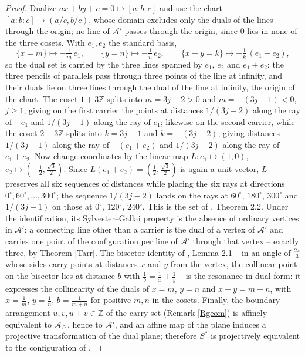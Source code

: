 \documentclass{article}
\def\Z{{\mathbb Z}}
\begin{document}
	\begin{proof}
		Dualize $ax+by+c=0\mapsto[a:b:c]$ and use the chart $[a:b:c]\mapsto(a/c,b/c)$, whose domain excludes only the duals of the lines through the origin; no line of $\mathcal A'$ passes through the origin, since $0$ lies in none of the three cosets. With $e_1,e_2$ the standard basis,
		$$\{x=m\}\mapsto-\tfrac1m\,e_1,\qquad \{y=n\}\mapsto-\tfrac1n\,e_2,\qquad \{x+y=k\}\mapsto-\tfrac1k\,(e_1+e_2),$$
		so the dual set is carried by the three lines spanned by $e_1$, $e_2$ and $e_1+e_2$: the three pencils of parallels pass through three points of the line at infinity, and their duals lie on three lines through the dual of the line at infinity, the origin of the chart. The coset $1+3\Z$ splits into $m=3j-2>0$ and $m=-(3j-1)<0$, $j\geq1$, giving on the first carrier the points at distances $1/(3j-2)$ along the ray of $-e_1$ and $1/(3j-1)$ along the ray of $e_1$; likewise on the second carrier, while the coset $2+3\Z$ splits into $k=3j-1$ and $k=-(3j-2)$, giving distances $1/(3j-1)$ along the ray of $-(e_1+e_2)$ and $1/(3j-2)$ along the ray of $e_1+e_2$. Now change coordinates by the linear map $L\colon e_1\mapsto(1,0)$, $e_2\mapsto(-\frac12,\frac{\sqrt3}2)$. Since $L(e_1+e_2)=(\frac12,\frac{\sqrt3}2)$ is again a unit vector, $L$ preserves all six sequences of distances while placing the six rays at directions $0^\circ,60^\circ,\dots,300^\circ$; the sequence $1/(3j-2)$ lands on the rays at $60^\circ$, $180^\circ$, $300^\circ$ and $1/(3j-1)$ on those at $0^\circ$, $120^\circ$, $240^\circ$. This is the set of \cite{BDSYZ}, Theorem 2.2. Under the identification, its Sylvester--Gallai property is the absence of ordinary vertices in $\mathcal A'$: a connecting line other than a carrier is the dual of a vertex of $\mathcal A'$ and carries one point of the configuration per line of $\mathcal A'$ through that vertex -- exactly three, by Theorem \ref{Tarr}. The bisector identity of \cite{BDSYZ}, Lemma 2.1 -- in an angle of $\frac{2\pi}3$ whose sides carry points at distances $x$ and $y$ from the vertex, the collinear point on the bisector lies at distance $b$ with $\frac1b=\frac1x+\frac1y$ -- is the resonance in dual form: it expresses the collinearity of the duals of $x=m$, $y=n$ and $x+y=m+n$, with $x=\frac1m$, $y=\frac1n$, $b=\frac1{m+n}$ for positive $m,n$ in the cosets. Finally, the boundary arrangement $u,v,u+v\in\Z$ of the carry set (Remark \ref{Rgeom}) is affinely equivalent to $\mathcal A_\triangle$, hence to $\mathcal A'$, and an affine map of the plane induces a projective transformation of the dual plane; therefore $S^*$ is projectively equivalent to the configuration of \cite{BDSYZ}.
	\end{proof}
\end{document}
